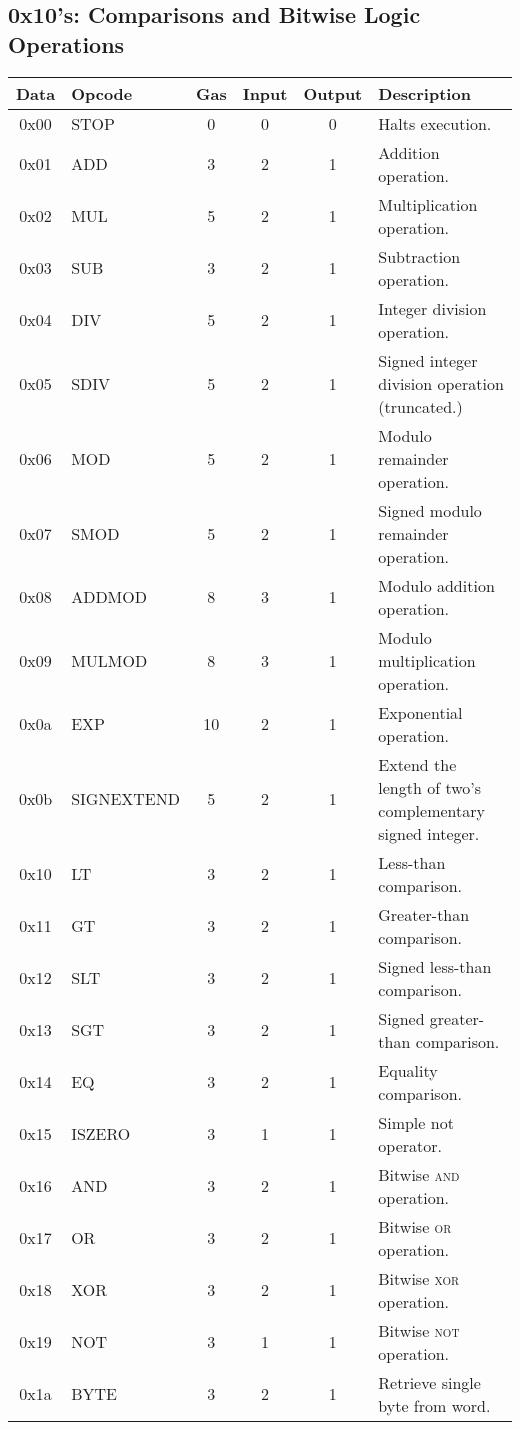 \documentclass[10pt,a4paper,leqno,bibliography=totoc]{scrartcl}
\newenvironment{alphafootnotes}
{\par\edef\savedfootnotenumber{\number\value{footnote}}
\renewcommand{\thefootnote}{\alph{footnote}}
\setcounter{footnote}{0}}
{\par\setcounter{footnote}{\savedfootnotenumber}}
\begin{document}
\begin{alphafootnotes}
		\subsection{0x10's: Comparisons and Bitwise Logic Operations}
			\begin{longtable}{|cP{2.8cm}cccp{6cm}|}
			\hline
			\textbf{Data} & \textbf{Opcode} & \textbf{Gas} & \textbf{Input} & \textbf{Output} & \textbf{Description} \\
			\hline
			0x00 & STOP & 0 & 0 & 0 & Halts execution. \\
			0x01 & ADD & 3 & 2 & 1 & Addition operation. \\
			0x02 & MUL & 5 & 2 & 1 & Multiplication operation. \\
			0x03 & SUB & 3 & 2 & 1 & Subtraction operation. \\
			0x04 & DIV & 5 & 2 & 1 & Integer division operation. \\
			0x05 & SDIV & 5 & 2 & 1 & Signed integer division operation (truncated.)\\
			0x06 & MOD & 5 & 2 & 1 & Modulo remainder operation. \\
			0x07 & SMOD & 5 & 2 & 1 & Signed modulo remainder operation. \\
			0x08 & ADDMOD & 8 & 3 & 1 & Modulo addition operation. \\
			0x09 & MULMOD & 8 & 3 & 1 & Modulo multiplication operation. \\
			0x0a & EXP & 10 & 2 & 1 & Exponential operation. \\
			0x0b & SIGNEXTEND & 5  & 2 & 1 & Extend the length of two's complementary signed integer. \\
			0x10 & LT & 3 & 2 & 1 & Less-than comparison. \\
			0x11 & GT & 3 & 2 & 1 & Greater-than comparison. \\
			0x12 & SLT & 3 & 2 & 1 & Signed less-than comparison. \\
			0x13 & SGT & 3 & 2 & 1 & Signed greater-than comparison. \\
			0x14 & EQ & 3 & 2 & 1 & Equality comparison. \\
			0x15 & ISZERO & 3 & 1 & 1 & Simple not operator. \\
			0x16 & AND & 3 & 2 & 1 & Bitwise \textsc{and} operation. \\
			0x17 & OR & 3 & 2 & 1 & Bitwise \textsc{or} operation. \\
			0x18 & XOR & 3 & 2 & 1 & Bitwise \textsc{xor} operation. \\
			0x19 & NOT & 3 & 1 & 1 & Bitwise \textsc{not} operation. \\
			0x1a & BYTE & 3 & 2 & 1 & Retrieve single byte from word. \\
			\hline
			\end{longtable}


\end{alphafootnotes}
\end{document}
